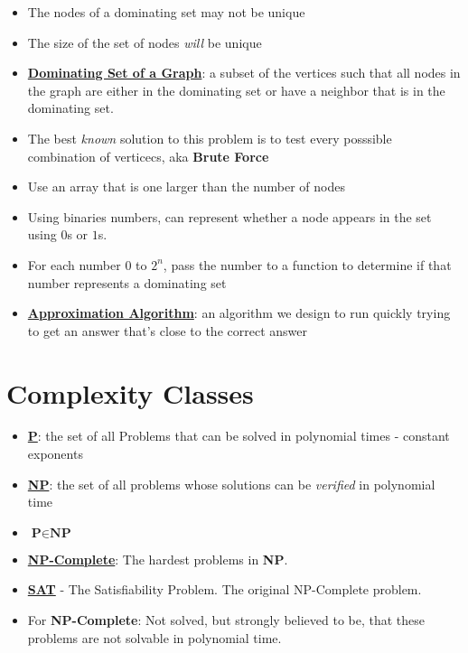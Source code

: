\documentclass[12pt]{article}
\newcommand{\definition}[1]{\underline{\textbf{#1}}}
\begin{document}
\begin{itemize}

	\item The nodes of a dominating set may not be unique
	\item The size of the set of nodes \textit{will} be unique

	\item \definition{Dominating Set of a Graph}: a subset of the vertices such that all nodes in the graph are either in the dominating set or have a neighbor that is in the dominating set.

	\item The best \textit{known} solution to this problem is to test every posssible combination of verticecs, aka \textbf{Brute Force}

	\item Use an array that is one larger than the number of nodes

	\item Using binaries numbers, can represent whether a node appears in the set using $0$s or $1$s.

	\item For each number 0 to $2^n$, pass the number to a function to determine if that number represents a dominating set

	\item \definition{Approximation Algorithm}: an algorithm we design to run quickly trying to get an answer that's close to the correct answer

\end{itemize}

\section*{Complexity Classes}

\begin{itemize}

	\item \definition{P}: the set of all Problems that can be solved in polynomial times - constant exponents

	\item \definition{NP}: the set of all problems whose solutions can be \textit{verified} in polynomial time

	\item $\textbf{P} \in \textbf{NP}$

	\item \definition{NP-Complete}: The hardest problems in \textbf{NP}.

	\item \definition{SAT} - The Satisfiability Problem. The original NP-Complete problem. 
	
	\item For \textbf{NP-Complete}: Not solved, but strongly believed to be, that these problems are not solvable in polynomial time.

\end{itemize}
\end{document}
